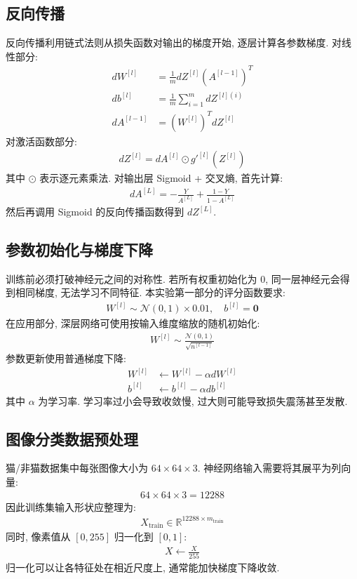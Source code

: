 \documentclass{../../nndlcourse}
\begin{document}
\subsection{反向传播}

反向传播利用链式法则从损失函数对输出的梯度开始, 逐层计算各参数梯度. 对线性部分:
\begin{align}
    dW^{[l]} &= \frac{1}{m}dZ^{[l]}\left(A^{[l-1]}\right)^T \\
    db^{[l]} &= \frac{1}{m}\sum_{i=1}^{m}dZ^{[l](i)} \\
    dA^{[l-1]} &= \left(W^{[l]}\right)^T dZ^{[l]}
\end{align}
对激活函数部分:
\begin{align}
    dZ^{[l]} = dA^{[l]} \odot g'^{[l]}\left(Z^{[l]}\right)
\end{align}
其中 $\odot$ 表示逐元素乘法. 对输出层 Sigmoid + 交叉熵, 首先计算:
\begin{align}
    dA^{[L]} =
    -\frac{Y}{A^{[L]}} + \frac{1-Y}{1-A^{[L]}}
\end{align}
然后再调用 Sigmoid 的反向传播函数得到 $dZ^{[L]}$.

\subsection{参数初始化与梯度下降}

训练前必须打破神经元之间的对称性. 若所有权重初始化为 0, 同一层神经元会得到相同梯度, 无法学习不同特征. 本实验第一部分的评分函数要求:
\begin{align}
    W^{[l]} \sim \mathcal{N}(0,1)\times 0.01,\quad b^{[l]}=\boldsymbol{0}
\end{align}
在应用部分, 深层网络可使用按输入维度缩放的随机初始化:
\begin{align}
    W^{[l]} \sim \frac{\mathcal{N}(0,1)}{\sqrt{n^{[l-1]}}}
\end{align}
参数更新使用普通梯度下降:
\begin{align}
    W^{[l]} &\leftarrow W^{[l]} - \alpha dW^{[l]} \\
    b^{[l]} &\leftarrow b^{[l]} - \alpha db^{[l]}
\end{align}
其中 $\alpha$ 为学习率. 学习率过小会导致收敛慢, 过大则可能导致损失震荡甚至发散.

\subsection{图像分类数据预处理}

猫/非猫数据集中每张图像大小为 $64\times64\times3$. 神经网络输入需要将其展平为列向量:
\begin{align}
    64\times64\times3 = 12288
\end{align}
因此训练集输入形状应整理为:
\begin{align}
    X_{\mathrm{train}} \in \mathbb{R}^{12288\times m_{\mathrm{train}}}
\end{align}
同时, 像素值从 $[0,255]$ 归一化到 $[0,1]$:
\begin{align}
    X \leftarrow \frac{X}{255}
\end{align}
归一化可以让各特征处在相近尺度上, 通常能加快梯度下降收敛.
\end{document}
